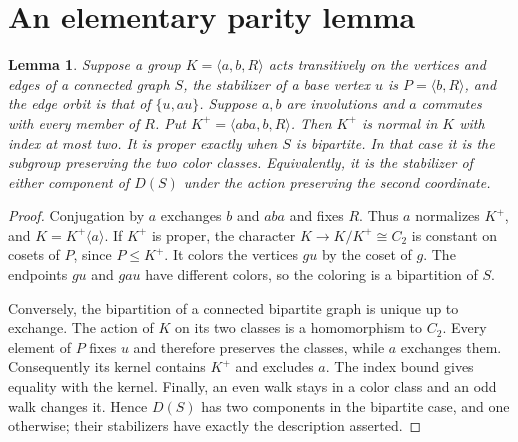 \documentclass[11pt,a4paper]{article}
\newtheorem{lemma}[theorem]{Lemma}
\newcommand{\gen}[1]{\langle #1\rangle}
\begin{document}
\section{An elementary parity lemma}
\begin{lemma}\label{parity}
Suppose a group $K=\gen{a,b,R}$ acts transitively on the vertices
and edges of a connected graph $S$, the stabilizer of a base vertex
$u$ is $P=\gen{b,R}$, and the edge orbit is that of $\{u,au\}$.
Suppose $a,b$ are involutions and $a$ commutes with every member
of $R$. Put $K^+=\gen{aba,b,R}$.
Then $K^+$ is normal in $K$ with index at most two.
It is proper exactly when $S$ is bipartite. In that case it is
the subgroup preserving the two color classes. Equivalently,
it is the stabilizer of either component of $D(S)$ under the
action preserving the second coordinate.
\end{lemma}
\begin{proof}
Conjugation by $a$ exchanges $b$ and $aba$ and fixes $R$.
Thus $a$ normalizes $K^+$, and $K=K^+\gen a$. If $K^+$ is proper,
the character $K\longrightarrow K/K^+\cong C_2$ is constant on
cosets of $P$, since $P\le K^+$. It colors the vertices $gu$
by the coset of $g$. The endpoints $gu$ and $gau$ have different
colors, so the coloring is a bipartition of $S$.

Conversely, the bipartition of a connected bipartite graph is
unique up to exchange. The action of $K$ on its two classes is
a homomorphism to $C_2$. Every element of $P$ fixes $u$ and
therefore preserves the classes, while $a$ exchanges them.
Consequently its kernel contains $K^+$ and excludes $a$.
The index bound gives equality with the kernel.
Finally, an even walk stays in a color class and an odd walk
changes it. Hence $D(S)$ has two components in the bipartite
case, and one otherwise; their stabilizers have exactly the
description asserted.
\end{proof}
\end{document}
